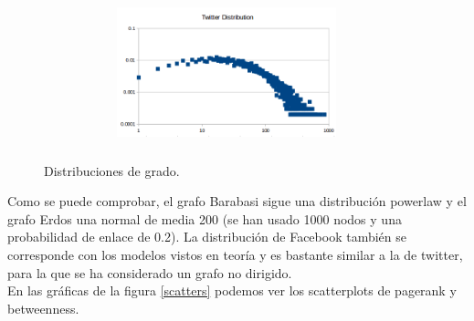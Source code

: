 \documentclass[spanish]{assignment}
\begin{document}
\begin{figure}[ht!]
\begin{subfigure}[t!]{\textwidth}
\begin{subfigure}[t!]{\textwidth}
			\end{subfigure}
			\begin{subfigure}[t!]{\textwidth}
				\centering
				\includegraphics[width=180pt, height=120pt]{img/twitter_d.png}
			\end{subfigure}
		\end{subfigure}
		\caption{%
			Distribuciones de grado.
		}%
		\label{distribuciones}
	\end{figure}
	
	Como se puede comprobar, el grafo Barabasi sigue una distribución powerlaw y el grafo Erdos una normal de media 200 
	(se han usado 1000 nodos y una probabilidad de enlace de 0.2). La distribución de Facebook también se corresponde con 
	los modelos vistos en teoría y es bastante similar a la de twitter, para la que se ha considerado un grafo no dirigido.\\
	
	En las gráficas de la figura \ref{scatters} podemos ver los scatterplots de pagerank y betweenness.\\
	
\end{document}
